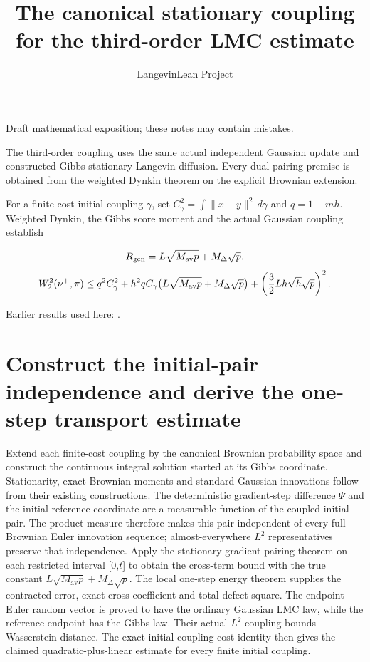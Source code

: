 \documentclass[11pt,a4paper]{article}
\title{\texorpdfstring{The canonical stationary coupling for the third-order LMC estimate}{The canonical stationary coupling for the third-order LMC estimate}}
\author{LangevinLean Project}
\date{}
\begin{document}
\maketitle
Draft mathematical exposition; these notes may contain mistakes.


The third-order coupling uses the same actual independent Gaussian update and constructed Gibbs-stationary Langevin diffusion. Every dual pairing premise is obtained from the weighted Dynkin theorem on the explicit Brownian extension.



For a finite-cost initial coupling \(\gamma\), set \(C_\gamma^2=\int\|x-y\|^2\,d\gamma\) and \(q=1-mh\). Weighted Dynkin, the Gibbs score moment and the actual Gaussian coupling establish


\[R_{\rm gen}=L\sqrt{M_{\rm av}p}+M_\Delta\sqrt p.\]
\[W_2^2(\nu^+,\pi)\le q^2C_\gamma^2+h^2qC_\gamma\bigl(L\sqrt{M_{\rm av}p}+M_\Delta\sqrt p\bigr)+\left(\frac32Lh\sqrt h\sqrt p\right)^2.\]

Earlier results used here: \cite[Section~3.45]{LangevinLean2026ULASC}.

\section{\texorpdfstring{Construct the initial-pair independence and derive the one-step transport estimate}{Construct the initial-pair independence and derive the one-step transport estimate}}


Extend each finite-cost coupling by the canonical Brownian probability space and construct the continuous integral solution started at its Gibbs coordinate. Stationarity, exact Brownian moments and standard Gaussian innovations follow from their existing constructions. The deterministic gradient-step difference \(\Psi\) and the initial reference coordinate are a measurable function of the coupled initial pair. The product measure therefore makes this pair independent of every full Brownian Euler innovation sequence; almost-everywhere \(L^{2}\) representatives preserve that independence. Apply the stationary gradient pairing theorem on each restricted interval [0,\(t\)] to obtain the cross-term bound with the true constant \(L\sqrt{M_{\mathrm{av}}p}+M_\Delta\sqrt p\). The local one-step energy theorem supplies the contracted error, exact cross coefficient and total-defect square. The endpoint Euler random vector is proved to have the ordinary Gaussian LMC law, while the reference endpoint has the Gibbs law. Their actual \(L^{2}\) coupling bounds Wasserstein distance. The exact initial-coupling cost identity then gives the claimed quadratic-plus-linear estimate for every finite initial coupling.
\end{document}
